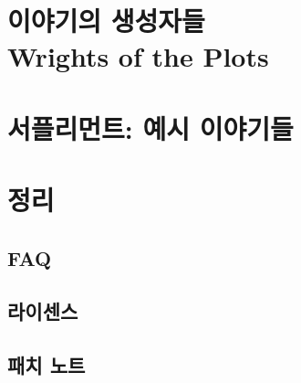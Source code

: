\documentclass[8pt,b5paper]{book}
\newif\ifprintout
\let\oldhyperlink\hyperlink
\let\oldhref\href
\renewcommand{\hyperlink}[2]{#2(\pageref{#1}쪽)}
\renewcommand{\href}[2]{#2(\url{#1})}
\begin{document}
	\part{이야기의 생성자들 \\ Wrights of the Plots}
		
	
	\ifprintout\else
	\part{서플리먼트: 예시 이야기들}
		
	\fi
	
	\ifprintout\else
	\part{정리}
	\fi
%			
		
		\ifprintout\else
		\chapter*{FAQ}
			
		\fi
		
		\chapter*{라이센스}
			 
		
		\ifprintout\else
		\chapter*{패치 노트}
			
		
			\printindex
		\fi
	
	\vspace*{\fill}
	
	\ifprintout
		\let\hyperlink\oldhyperlink
		\let\href\oldhref
	\fi
	
	{\doclicenseThis}
	
	\ifprintout
		\let\oldhyperlink\hyperlink
		\let\oldhref\href
		
		\renewcommand{\hyperlink}[2]{#2(\pageref{#1} 쪽)}
		\renewcommand{\href}[2]{#2(\url{#1})}
	\fi
	
\end{document}
